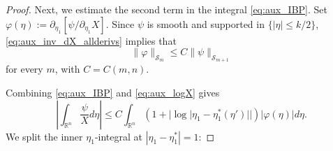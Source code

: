 \documentclass[12pt,a4paper]{amsart}
\numberwithin{equation}{section}
\theoremstyle{plain}
\theoremstyle{definition}
\begin{document}
\begin{proof}
Next, we estimate the second term in the integral \eqref{eq:aux_IBP}. Set $\varphi(\eta):=\partial_{\eta_1}[\psi/\partial_{\eta_1}X]$.
Since $\psi$ is smooth and supported in $\{|\eta|\leq k/2\}$, \eqref{eq:aux_inv_dX_allderivs} implies that
\begin{equation}\label{eq:aux_phi_bound}
  \|\varphi\|_{\mathscr{S}_m}\leq C\|\psi\|_{\mathscr{S}_{m+1}}
\end{equation}
for every $m$, with $C=C(m,n)$.

Combining \eqref{eq:aux_IBP} and \eqref{eq:aux_logX} gives
\begin{equation*}
    \left|\int_{\mathbb{R}^n}\frac{\psi}{X} d\eta\right|
    \leq C\int_{\mathbb{R}^n}\left(1+|\log|\eta_1-\eta_1^*(\eta')||\right) |\varphi(\eta)| d\eta.
\end{equation*}
We split the inner $\eta_1$-integral at $|\eta_1-\eta_1^*|=1$:


\end{proof}
\end{document}

